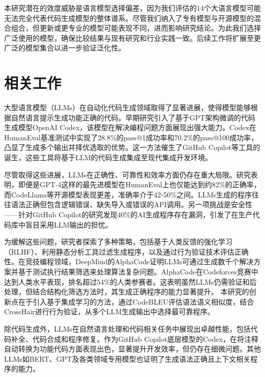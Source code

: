 \documentclass{article}
\begin{document}
\begin{CJK*}{UTF8}{gbsn}
本研究潜在的效度威胁是语言模型选择偏差，因为我们评估的14个大语言模型可能无法完全代表代码生成模型的整体谱系。尽管我们纳入了专有模型与开源模型的混合组合，但更新或更专业的模型可能表现不同，进而影响研究结论。为此我们选择广泛使用的模型，确保比较结果与现有研究和行业实践一致。后续工作将扩展至更广泛的模型集合以进一步验证泛化性。
\section{相关工作}
大型语言模型（LLMs）在自动化代码生成领域取得了显著进展，使得模型能够根据自然语言提示生成功能正确的代码。早期研究引入了基于GPT架构微调的代码生成模型OpenAI Codex，该模型在解决编程问题方面展现出强大能力\cite{chen2021evaluating}。Codex在HumanEval基准测试中实现了28.8\%的pass@1成功率和70.2\%的pass@100成功率，凸显了生成多个输出并择优选取的优势。这一方法催生了GitHub Copilot等工具的诞生，这些工具将基于LLM的代码生成集成至现代集成开发环境\cite{pearce2022asleep}。

尽管取得这些进展，LLMs在正确性、可靠性和效率方面仍存在重大局限。研究表明，即便是GPT-4这样的最先进模型在HumanEval上也仅能达到约82\%的正确率，而CodeLlama等开源模型表现更差，准确率介于42-50\%之间\cite{bubeck2023sparks, ziemniak2023codellama}。LLMs生成的程序往往语法正确但包含逻辑错误、缺失导入或错误的API调用。另一项挑战是安全性——针对GitHub Copilot的研究发现40\%的AI生成程序存在漏洞，引发了在生产代码库中盲目采用LLM输出的担忧\cite{pearce2022asleep}。

为缓解这些问题，研究者探索了多种策略，包括基于人类反馈的强化学习（RLHF）、利用静态分析工具过滤生成程序，以及通过行为验证技术评估正确性\cite{zhao2022large}。在竞技编程领域，DeepMind的AlphaCode证明LLMs可通过生成数千个解决方案并基于测试执行结果筛选来处理算法复杂问题。AlphaCode在Codeforces竞赛中达到人类水平表现，排名超过54\%的人类参赛者\cite{li2022competition}。这表明虽然LLMs仍需验证和后处理，但结合结构化筛选方法时，其生成正确程序的能力显著提升。
本研究的创新点在于引入基于集成学习的方法，通过CodeBLEU评估语法语义相似度，结合CrossHair进行行为验证，从多个LLM生成输出中选择最可靠程序。

除代码生成外，LLMs在自然语言处理和代码相关任务中展现出卓越性能，包括代码补全\cite{deng2022fuzzing, huang2022prompt, jain2022jigsaw, li2022competition, xu2022systematic}、代码合成\cite{liu2023your}和程序修复\cite{xia2023automated}。作为GitHub Copilot底层模型的Codex\cite{codex}\cite{copilot}，在将注释自动转换为功能代码方面表现出色，显著提升开发效率，但仍存在细微问题。其他LLMs如BERT\cite{devlin2018bert, tian2023best}、GPT\cite{gpt4, chatGPT, xia2023keep}及各类领域专用模型\cite{le2023invalidator, paul2023automated}也证明了生成语法正确且上下文相关程序的能力。


\end{CJK*}
\end{document}
